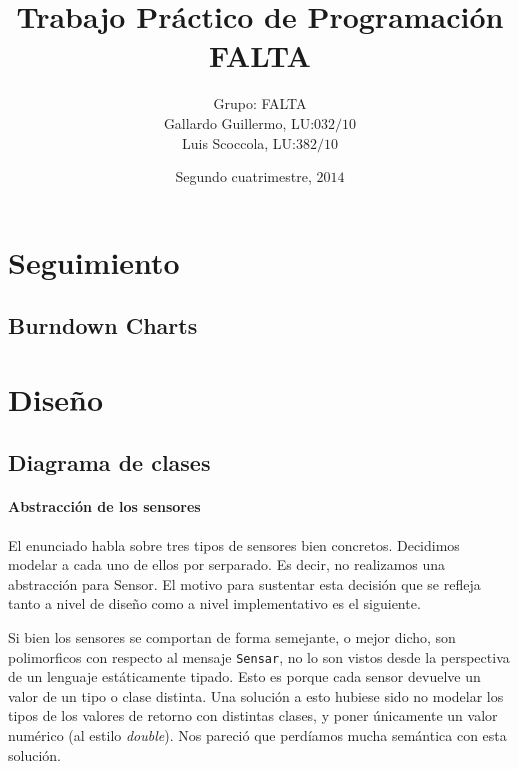 \documentclass{article}
\newcommand{\prodback}{\textit{Product Backlog}}
\newcommand{\sprintback}{\textit{Sprint Backlog}}
\begin{document}
  \title{Trabajo Pr\'actico de Programaci\'on FALTA}
  \date{Segundo cuatrimestre, $2014$}
  \author{Grupo: FALTA \\ Gallardo Guillermo, LU:$032/10$\\ Luis Scoccola, LU:$382/10$}

  \maketitle
 
  \newpage

  

  

  \section{Seguimiento}
    \subsection{Burndown Charts}

  \section{Dise\~no}

    \subsection{Diagrama de clases}

    \paragraph{Abstracci\'on de los sensores}
    El enunciado habla sobre tres tipos de sensores bien concretos.
    Decidimos modelar a cada uno de ellos por serparado. Es decir, no realizamos
    una abstracci\'on para Sensor. El motivo para sustentar esta decisi\'on
    que se refleja tanto a nivel de dise\~no como a nivel implementativo es
    el siguiente.

    Si bien los sensores se comportan de forma semejante,
    o mejor dicho, son polimorficos con respecto al mensaje \texttt{Sensar},
    no lo son vistos desde la perspectiva de un lenguaje est\'aticamente tipado.
    Esto es porque cada sensor devuelve un valor de un tipo o clase distinta.
    Una soluci\'on a esto hubiese sido no modelar los tipos de los valores de
    retorno con distintas clases, y poner \'unicamente un valor num\'erico
    (al estilo \textit{double}). Nos
    pareci\'o que perd\'iamos mucha sem\'antica con esta soluci\'on.
\end{document}
